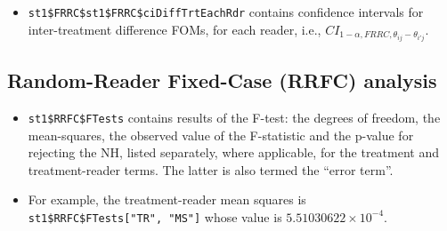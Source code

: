 \documentclass[
]{book}
\newenvironment{Shaded}{\begin{snugshade}}{\end{snugshade}}
\newcommand{\CommentTok}[1]{\textcolor[rgb]{0.56,0.35,0.01}{\textit{#1}}}
\newcommand{\DataTypeTok}[1]{\textcolor[rgb]{0.13,0.29,0.53}{#1}}
\newcommand{\DecValTok}[1]{\textcolor[rgb]{0.00,0.00,0.81}{#1}}
\newcommand{\KeywordTok}[1]{\textcolor[rgb]{0.13,0.29,0.53}{\textbf{#1}}}
\newcommand{\NormalTok}[1]{#1}
\newcommand{\OperatorTok}[1]{\textcolor[rgb]{0.81,0.36,0.00}{\textbf{#1}}}
\providecommand{\tightlist}{%
  \setlength{\itemsep}{0pt}\setlength{\parskip}{0pt}}
\begin{document}
\begin{itemize}
\tightlist
\item
  \texttt{st1\$FRRC\$st1\$FRRC\$ciDiffTrtEachRdr} contains confidence intervals for inter-treatment difference FOMs, for each reader, i.e., \(CI_{1-\alpha,FRRC,\theta_{i j} - \theta_{i' j}}\).
\end{itemize}

\hypertarget{or-applications-RRFC-dataset02-RJafroc}{%
\subsection{Random-Reader Fixed-Case (RRFC) analysis}\label{or-applications-RRFC-dataset02-RJafroc}}

\begin{Shaded}
\end{Shaded}

\begin{itemize}
\tightlist
\item
  \texttt{st1\$RRFC\$FTests} contains results of the F-test: the degrees of freedom, the mean-squares, the observed value of the F-statistic and the p-value for rejecting the NH, listed separately, where applicable, for the treatment and treatment-reader terms. The latter is also termed the ``error term''.
\item
  For example, the treatment-reader mean squares is \texttt{st1\$RRFC\$FTests{[}"TR",\ "MS"{]}} whose value is \ensuremath{5.51030622\times 10^{-4}}.
\end{itemize}

\begin{Shaded}
\end{Shaded}
\end{document}
